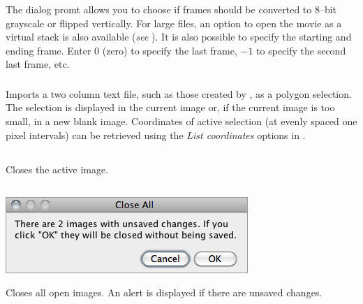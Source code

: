 \medskip{}


The dialog promt allows you to choose if frames should be converted
to 8--bit grayscale or flipped vertically. For large files, an option
to open the movie as a virtual stack is also available (\emph{see}
). It is also possible to specify the
starting and ending frame. Enter $0$ (zero) to specify the last frame,
$-1$ to specify the second last frame, etc.




\subsubsection[\protect\userinterface{XY Coordinates\ldots{}}]{\protect{}\label{sub:Import>XYcoordinates...}}

Imports a two column text file, such as those created by ,
as a polygon selection. The selection is displayed in the current
image or, if the current image is too small, in a new blank image.
Coordinates of active selection (at evenly spaced one pixel intervals)
can be retrieved using the \emph{List coordinates} options in .


\subsection{\protect{}\label{sub:Close[w]}}

Closes the active image.


\subsection{\protect{}\label{sub:Close-All}}

\begin{minipage}[c][1\totalheight][t]{0.48\columnwidth}%
\includegraphics[scale=0.55]{images/Close-All}%
\end{minipage}%
\begin{minipage}[c][1\totalheight][t]{0.52\columnwidth}%
Closes all open images. An alert is displayed if there are unsaved
changes.%
\end{minipage}


